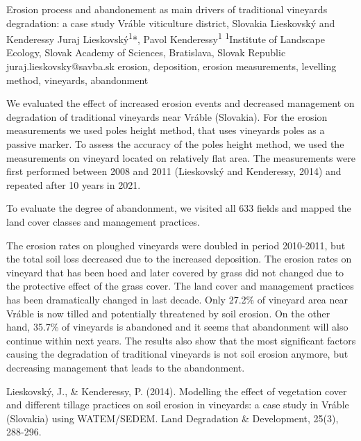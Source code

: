 \abstract
{Erosion process and abandonement as main drivers of traditional vineyards degradation: a case study Vráble viticulture district, Slovakia} 
{Lieskovský and Kenderessy} 
{Juraj Lieskovský\textsuperscript{1}*, Pavol Kenderessy\textsuperscript{1}} 
{\TLtag} 
{
\textsuperscript{1}Institute of Landscape Ecology, Slovak Academy of Sciences, Bratislava, Slovak Republic
}
{juraj.lieskovsky@savba.sk}  %
{erosion, deposition, erosion measurements, levelling method, vineyards, abandonment}
{We evaluated the effect of increased erosion events and decreased management on degradation of traditional vineyards near Vráble (Slovakia). For the erosion measurements we used poles height method, that uses vineyards poles as a passive marker. To assess the accuracy of the poles height method, we used the measurements on vineyard located on relatively flat area. The measurements were first performed between 2008 and 2011 (Lieskovský and Kenderessy, 2014) and repeated after 10 years in 2021.

To evaluate the degree of abandonment, we visited all 633 fields and mapped the land cover classes and management practices. 

The erosion rates on ploughed vineyards were doubled in period 2010-2011, but the total soil loss decreased due to the increased deposition. The erosion rates on vineyard that has been hoed and later covered by grass did not changed due to the protective effect of the grass cover. The land cover and management practices has been dramatically changed in last decade. Only 27.2\% of vineyard area near Vráble is now tilled and potentially threatened by soil erosion. On the other hand, 35.7\% of vineyards is abandoned and it seems that abandonment will also continue within next years. The results also show that the most significant factors causing the degradation of traditional vineyards is not soil erosion anymore, but decreasing management that leads to the abandonment.
}
{Lieskovský, J., \& Kenderessy, P. (2014). Modelling the effect of vegetation cover and different tillage practices on soil erosion in vineyards: a case study in Vráble (Slovakia) using WATEM/SEDEM. Land Degradation \& Development, 25(3), 288-296.
}

